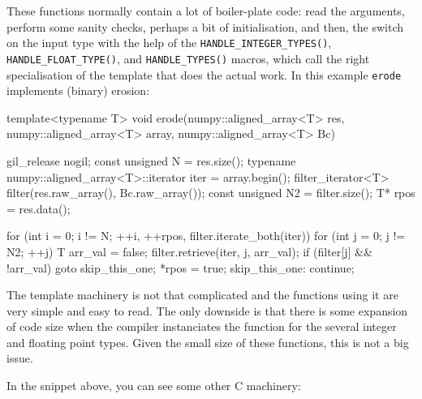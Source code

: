 \documentclass{article}
\newcommand*{\cpp}{{C\nolinebreak[4]\hspace{-.05em}\raisebox{.4ex}{\tiny\textbf{++}}}}
\let\code\texttt
\begin{document}
These functions normally contain a lot of boiler-plate code: read the
arguments, perform some sanity checks, perhaps a bit of initialisation, and
then, the switch on the input type with the help of the
\code{HANDLE\_INTEGER\_TYPES()}, \code{HANDLE\_FLOAT\_TYPE()}, and
\code{HANDLE\_TYPES()} macros, which call the right specialisation of the
template that does the actual work. In this example \code{erode} implements
(binary) erosion:

\begin{cplusplus}
template<typename T>
void erode(numpy::aligned_array<T> res,
            numpy::aligned_array<T> array,
            numpy::aligned_array<T> Bc) {
    gil_release nogil;
    const unsigned N = res.size();
    typename numpy::aligned_array<T>::iterator iter = array.begin();
    filter_iterator<T> filter(res.raw_array(), Bc.raw_array());
    const unsigned N2 = filter.size();
    T* rpos = res.data();

    for (int i = 0;
                i != N;
                ++i, ++rpos, filter.iterate_both(iter)) {
        for (int j = 0; j != N2; ++j) {
            T arr_val = false;
            filter.retrieve(iter, j, arr_val);
            if (filter[j] && !arr_val) {
                goto skip_this_one;
            }
        }
        *rpos = true;
        skip_this_one: continue;
    }
}
\end{cplusplus}

The template machinery is not that complicated and the functions using it are
very simple and easy to read. The only downside is that there is some expansion
of code size when the compiler instanciates the function for the several
integer and floating point types. Given the small size of these functions, this
is not a big issue.

In the snippet above, you can see some other \cpp{} machinery:
\end{document}
